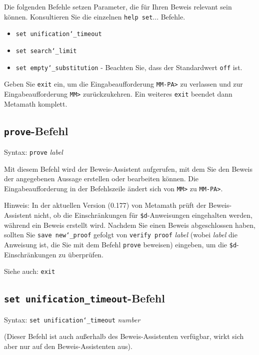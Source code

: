Die folgenden Befehle setzen Parameter, die für Ihren Beweis relevant sein können. Konsultieren Sie die einzelnen \texttt{help set}... Befehle. \begin{itemize}
   \item[] \texttt{set unification{\char`\_}timeout}
 \item[]
    \texttt{set search{\char`\_}limit}
  \item[]
    \texttt{set empty{\char`\_}substitution} - Beachten Sie, dass der Standardwert \texttt{off} ist.
\end{itemize}

Geben Sie \texttt{exit} ein, um die Eingabeaufforderung \texttt{MM-PA>} zu verlassen und zur Eingabeaufforderung \texttt{MM>} zurückzukehren. Ein weiteres \texttt{exit} beendet dann Metamath komplett. 


\subsection{\texttt{prove}-Befehl}

Syntax:  \texttt{prove} {\em label}

Mit diesem Befehl wird der Beweis-Assistent aufgerufen, mit dem Sie den Beweis der angegebenen Aussage erstellen oder bearbeiten können. Die Eingabeaufforderung in der Befehlszeile ändert sich von \texttt{MM>} zu \texttt{MM-PA>}. 

Hinweis: In der aktuellen Version (0.177) von Metamath prüft der Beweis-Assistent nicht, ob die Einschränkungen für \texttt{\$d}-Anweisungen eingehalten werden, während ein Beweis erstellt wird.  Nachdem Sie einen Beweis abgeschlossen haben, sollten Sie \texttt{save new{\char`\_}proof} gefolgt von \texttt{verify proof} {\em label} (wobei {\em label} die Anweisung ist, die Sie mit dem Befehl \texttt{prove} beweisen) eingeben, um die \texttt{\$d}-Einschränkungen zu überprüfen. 

Siehe auch: \texttt{exit}


\subsection{\texttt{set unification\_timeout}-Befehl}

Syntax:  \texttt{set unification{\char`\_}timeout} {\em number}

(Dieser Befehl ist auch außerhalb des Beweis-Assistenten verfügbar, wirkt sich aber nur auf den Beweis-Assistenten aus). 


